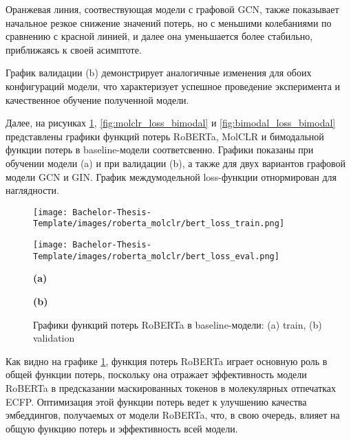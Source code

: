 Оранжевая линия, соотвествующая модели с графовой GCN, также показывает начальное резкое снижение значений потерь, но с меньшими колебаниями по сравнению с красной линией, и далее она уменьшается более стабильно, приближаясь к своей асимптоте.

График валидации (b) демонстрирует аналогичные изменения для обоих конфигураций модели, что характеризует успешное проведение эксперимента и качественное обучение полученной модели.

Далее, на рисунках \ref{fig:roberta_loss_bimodal}, \ref{fig:molclr_loss_bimodal} и \ref{fig:bimodal_loss_bimodal} представлены графики функций потерь RoBERTa, MolCLR и бимодальной функции потерь в baseline-модели соответсвенно. Графики показаны при обучении модели (a) и при валидации (b), а также для двух вариантов графовой модели GCN и GIN. График междумодельной loss-функции отнормирован для наглядности.


\begin{figure}[h]
    \begin{minipage}{0.5\textwidth}
        \centering
        \texttt{[image: Bachelor-Thesis-Template/images/roberta\_molclr/bert\_loss\_train.png]}
    \end{minipage}%
    \begin{minipage}{0.5\textwidth}
        \centering
        \texttt{[image: Bachelor-Thesis-Template/images/roberta\_molclr/bert\_loss\_eval.png]}
    \end{minipage}%

    \newline
    \begin{minipage}{0.5\textwidth}
      \centering
    \textbf{(a)}
    \end{minipage}%
    \begin{minipage}{0.5\textwidth}
    \centering
    \textbf{(b)}
    \end{minipage}%
    
    \caption{\small Графики функций потерь RoBERTa в baseline-модели: (a) train, (b) validation}
    \label{fig:roberta_loss_bimodal}
\end{figure}

Как видно на графике \ref{fig:roberta_loss_bimodal}, функция потерь RoBERTa играет основную роль в общей функции потерь, поскольку она отражает эффективность модели RoBERTa в предсказании маскированных токенов в молекулярных отпечатках ECFP. Оптимизация этой функции потерь ведет к улучшению качества эмбеддингов, получаемых от модели RoBERTa, что, в свою очередь, влияет на общую функцию потерь и эффективность всей модели.

